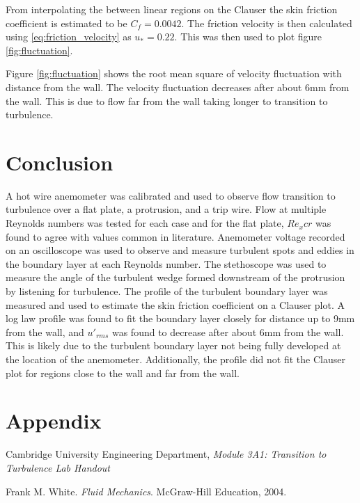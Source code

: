 \documentclass{article}
\begin{document}
From interpolating the between linear regions on the Clauser the skin friction coefficient is estimated to be $C_f = 0.0042$.
The friction velocity is then calculated using \ref{eq:friction_velocity} as $u_* = 0.22$.
This was then used to plot figure \ref{fig:fluctuation}.


Figure \ref{fig:fluctuation} shows the root mean square of velocity fluctuation with distance from the wall.
The velocity fluctuation decreases after about 6mm from the wall.
This is due to flow far from the wall taking longer to transition to turbulence.

\section{Conclusion}


A hot wire anemometer was calibrated and used to observe flow transition to turbulence over a flat plate, a protrusion, and a trip wire.
Flow at multiple Reynolds numbers was tested for each case and for the flat plate, $Re_xcr$ was found to agree with values common in literature.
Anemometer voltage recorded on an oscilloscope was used to observe and measure turbulent spots and eddies in the boundary layer at each Reynolds number.
The stethoscope was used to measure the angle of the turbulent wedge formed downstream of the protrusion by listening for turbulence.
The profile of the turbulent boundary layer was measured and used to estimate the skin friction coefficient on a Clauser plot.
A log law profile was found to fit the boundary layer closely for distance up to 9mm from the wall, and
$u'_{rms}$ was found to decrease after about 6mm from the wall.
This is likely due to the turbulent boundary layer not being fully developed at the location of the anemometer.
Additionally, the profile did not fit the Clauser plot for regions close to the wall and far from the wall.



\section{Appendix}

\begin{thebibliography}{9}
    Cambridge University Engineering Department, \textit{Module 3A1: Transition to Turbulence Lab Handout}

    Frank M. White. \textit{Fluid Mechanics}. McGraw-Hill Education, 2004.
\end{thebibliography}
\end{document}
